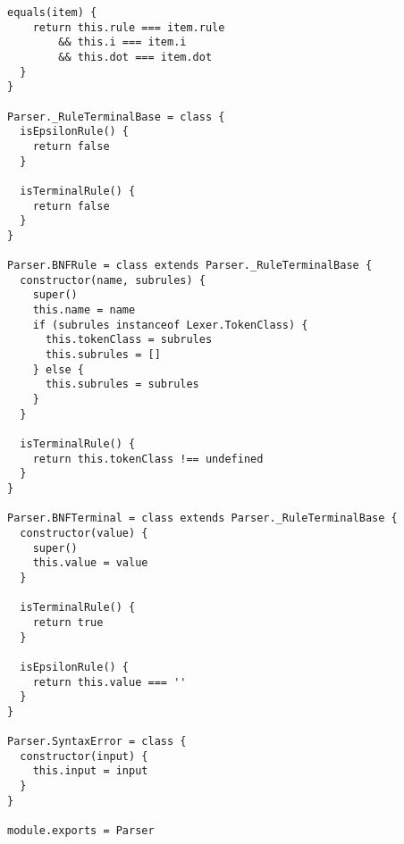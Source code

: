 \begin{lstlisting}[frame=single]
  equals(item) {
    return this.rule === item.rule 
        && this.i === item.i 
        && this.dot === item.dot
  }
}

Parser._RuleTerminalBase = class {
  isEpsilonRule() {
    return false
  }
  
  isTerminalRule() {
    return false
  }
}

Parser.BNFRule = class extends Parser._RuleTerminalBase {
  constructor(name, subrules) {
    super()
    this.name = name
    if (subrules instanceof Lexer.TokenClass) {
      this.tokenClass = subrules
      this.subrules = []
    } else {
      this.subrules = subrules
    }
  }
  
  isTerminalRule() {
    return this.tokenClass !== undefined
  }
}

Parser.BNFTerminal = class extends Parser._RuleTerminalBase {
  constructor(value) {
    super()
    this.value = value
  }
  
  isTerminalRule() {
    return true
  }
  
  isEpsilonRule() {
    return this.value === ''
  }
}

Parser.SyntaxError = class {
  constructor(input) {
    this.input = input
  }
}

module.exports = Parser
\end{lstlisting}